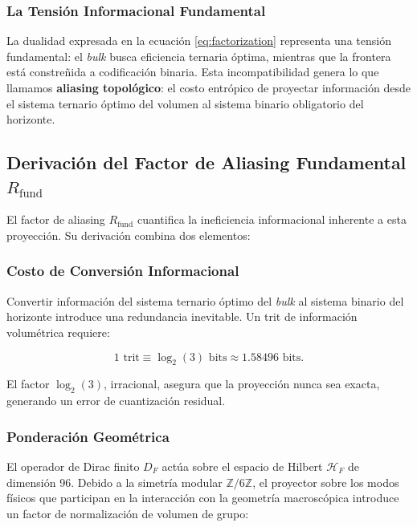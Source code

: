 \documentclass[12pt, a4paper]{article}
\theoremstyle{plain}
\theoremstyle{definition}
\begin{document}
\subsubsection{La Tensión Informacional Fundamental}

La dualidad expresada en la ecuación \eqref{eq:factorization} representa una tensión fundamental: el \textit{bulk} busca eficiencia ternaria óptima, mientras que la frontera está constreñida a codificación binaria. Esta incompatibilidad genera lo que llamamos \textbf{aliasing topológico}: el costo entrópico de proyectar información desde el sistema ternario óptimo del volumen al sistema binario obligatorio del horizonte.

\subsection{Derivación del Factor de Aliasing Fundamental $R_{\text{fund}}$}

El factor de aliasing $R_{\text{fund}}$ cuantifica la ineficiencia informacional inherente a esta proyección. Su derivación combina dos elementos:

\subsubsection{Costo de Conversión Informacional}

Convertir información del sistema ternario óptimo del \textit{bulk} al sistema binario del horizonte introduce una redundancia inevitable. Un trit de información volumétrica requiere:

\begin{equation}
1 \text{ trit} \equiv \log_2(3) \text{ bits} \approx 1.58496 \text{ bits}.
\label{eq:conversion_cost}
\end{equation}

El factor $\log_2(3)$, irracional, asegura que la proyección nunca sea exacta, generando un error de cuantización residual.

\subsubsection{Ponderación Geométrica}

El operador de Dirac finito $D_F$ actúa sobre el espacio de Hilbert $\mathcal{H}_F$ de dimensión 96. Debido a la simetría modular $\mathbb{Z}/6\mathbb{Z}$, el proyector sobre los modos físicos que participan en la interacción con la geometría macroscópica introduce un factor de normalización de volumen de grupo:
\end{document}
